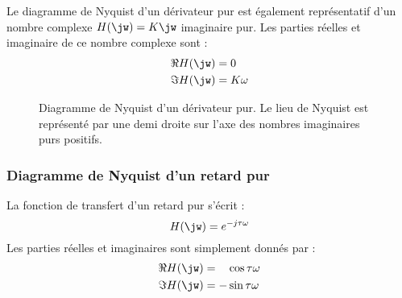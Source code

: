 Le diagramme de Nyquist d'un dérivateur pur est également représentatif d'un 
nombre complexe $H(\jw)=K\jw$ imaginaire pur. Les parties réelles et imaginaire
de ce nombre complexe sont :
\begin{align*}
    \Re{H(\jw)}&=0\\
    \Im{H(\jw)}&=K\omega
\end{align*}
\begin{figure}[!h]                                                                                                           
\begin{center}                                                                                                               
\end{center}
\caption{Diagramme de Nyquist d'un dérivateur pur. Le lieu de Nyquist 
    est représenté par une demi droite sur l'axe des nombres 
    imaginaires purs positifs.\label{fig-nyquist_3}}
\end{figure}

\newpage

\subsubsection{Diagramme de Nyquist d'un retard pur}

La fonction de transfert d'un retard pur s'écrit :
$$
H(\jw)=e^{-j\tau\omega}
$$
Les parties réelles et imaginaires sont simplement donnés par :
\begin{align*}
    \Re{H(\jw)}&=\hphantom{-}\cos{\tau\omega}\\
    \Im{H(\jw)}&=-\sin{\tau\omega}
\end{align*}

